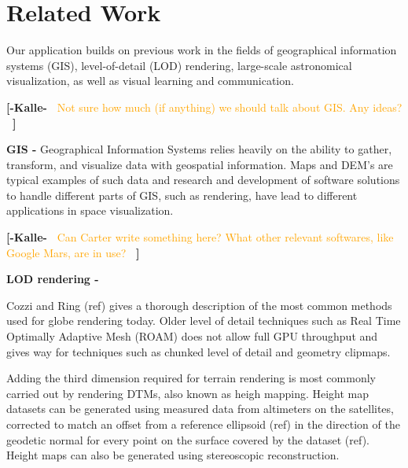 \documentclass[journal]{vgtc}                %
\newcommand{\kallecomment}[1]{\textbf{[-Kalle-~}
    \textcolor{orange}{#1}
    \textbf{~]}}
\begin{document}
\section{Related Work} \label{sec:relatedwork}
Our application builds on previous work in the fields of geographical information systems (GIS), level-of-detail (LOD) rendering, large-scale astronomical visualization, as well as visual learning and communication.

\kallecomment{Not sure how much (if anything) we should talk about GIS. Any ideas?}

\textbf{GIS - }Geographical Information Systems relies heavily on the ability to gather, transform, and visualize data with geospatial information.
Maps and DEM's are typical examples of such data and research and development of software solutions to handle different parts of GIS, such as rendering, have lead to different applications in space visualization.

\kallecomment{Can Carter write something here? What other relevant softwares, like Google Mars, are in use?}

\textbf{LOD rendering - } 

Cozzi and Ring (ref) gives a thorough description of the most common methods used for globe rendering today.
Older level of detail techniques such as Real Time Optimally Adaptive Mesh (ROAM) does not allow full GPU throughput and gives way for techniques such as chunked level of detail and geometry clipmaps.








Adding the third dimension required for terrain rendering is most commonly carried out by rendering DTMs, also known as heigh mapping.
Height map datasets can be generated using measured data from altimeters on the satellites, corrected to match an offset from a reference ellipsoid (ref) in the direction of the geodetic normal for every point on the surface covered by the dataset (ref).
Height maps can also be generated using stereoscopic reconstruction.
\end{document}
